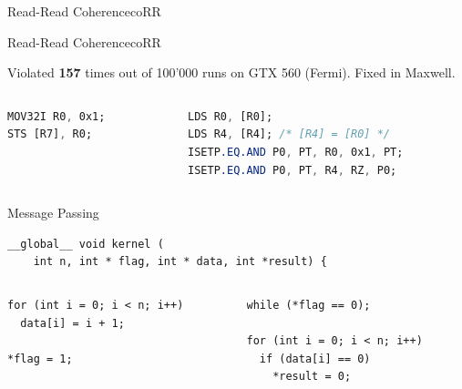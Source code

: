 \documentclass[aspectratio=169,compress]{beamer}
\newenvironment{sankeydiagram}[1][]{

  \def\sankeyflow##1##2{%
    \path[sankey fill]
    let
    \p1=(##1.north east),\p2=(##1.south east),
    \n1={atan2(\y1-\y2,\x1-\x2)-90},
    \p3=(##2.north west),\p4=(##2.south west),
    \n2={atan2(\y3-\y4,\x3-\x4)+90}
    in
    (\p1) to[out=\n1,in=\n2] (\p3) --
    (\p4) to[in=\n1,out=\n2] (\p2) -- cycle;
    \draw[sankey draw]
    let
    \p1=(##1.north east),\p2=(##1.south east),
    \n1={atan2(\y1-\y2,\x1-\x2)-90},
    \p3=(##2.north west),\p4=(##2.south west),
    \n2={atan2(\y3-\y4,\x3-\x4)+90}
    in
    (\p1) to[out=\n1,in=\n2] (\p3)
    (\p4) to[in=\n1,out=\n2] (\p2);
  }


  \tikzset{
    sankey tot length/.store in=\sankeytotallen,
    sankey tot quantity/.store in=\sankeytotalqty,
    sankey min radius/.store in=\sankeyminradius,
    sankey arrow length/.store in=\sankeyarrowlen,
    sankey debug/.is if=sankeydebug,
    sankey debug=false,
    sankey flow/.style={
      to path={
        \pgfextra{
          \pgfinterruptpath
          \edef\sankeystart{\tikztostart}
          \edef\sankeytarget{\tikztotarget}
          \sankeyflow{\sankeystart}{\sankeytarget}
          \endpgfinterruptpath
        }
      },
    },
    sankey node/.style={
      inner sep=0,minimum height={sankeyqtytolen(##1)},
      minimum width=0,draw=none,line width=0pt,
    },
    sankey angle/.store in=\sankeyangle,
    sankey fill/.style={line width=0pt,fill,white},
    sankey draw/.style={draw=black,line width=.4pt},
  }

  \newcommand\sankeynode[4]{%
    \node[sankey node=##1,rotate=##2] (##3) at (##4) {};
  }

  \newcommand\sankeynodestart[4]{%
    \sankeynode{##1}{##2}{##3}{##4}
    \begin{scope}[shift={(##3)},rotate=##2]
      \path[sankey fill]
      (##3.north west) -- ++(-\sankeyarrowlen,0)
      -- ([xshift=-\sankeyarrowlen/6]##3.west)
      -- ([xshift=-\sankeyarrowlen]##3.south west)
      -- (##3.south west) -- cycle;
      \path[sankey draw]
      (##3.north west) -- ++(-\sankeyarrowlen,0)
      -- ([xshift=-\sankeyarrowlen/6]##3.west)
      -- ([xshift=-\sankeyarrowlen]##3.south west)
      -- (##3.south west);
    \end{scope}
  }

  \newcommand\sankeynodeend[4]{%
    \sankeynode{##1}{##2}{##3}{##4}
    \begin{scope}[shift={(##3)},rotate=##2]
      \path[sankey fill]
      (##3.north east)
      -- ([xshift=\sankeyarrowlen]##3.east)
      -- (##3.south west) -- cycle;
      \path[sankey draw]
      (##3.north east)
      -- ([xshift=\sankeyarrowlen]##3.east)
      -- (##3.south west);
    \end{scope}
  }

  \newcommand\sankeyadvance[3][]{%
    \edef\name{##2}
    \ifstrempty{##1}{
      \def\newname{##2}
      \edef\name{##2-old}
      \path [late options={name=##2,alias=\name}];
    }{
      \def\newname{##1}
    }
    \path
    let
    \p1=(##2.north east),
    \p2=(##2.south east),
    \n1={atan2(\y1-\y2,\x1-\x2)-90},
    \p3=($(\p1)-(\p2)$),
    \n2={sankeylentoqty(veclen(\x3,\y3))},
    \p4=($(##2.east)!##3!-90:(##2.north east)$)
    in
    \pgfextra{
      \pgfmathsetmacro{\prop}{\n2}
      \pgfinterruptpath
      \sankeynode{\prop}{\n1}{\newname}{\p4}
      \path (\name) to[sankey flow] (\newname);
      \endpgfinterruptpath
    };
  }

  \newcommand\sankeyturn[3][]{%
    \edef\name{##2}
    \ifstrempty{##1}{
      \def\newname{##2}
      \edef\name{##2-old}
      \path [late options={name=##2,alias=\name}];
    }{
      \def\newname{##1}
    }
    \ifnumgreater{##3}{0}{
      \typeout{turn acw: ##3}
      \path
      let
      \p1=(##2.north east),
      \p2=(##2.south east),
      \p3=($(\p1)!-\sankeyminradius!(\p2)$),
      \n1={atan2(\y1-\y2,\x1-\x2)-90},
      \p4=($(\p1)-(\p2)$),
      \n2={sankeylentoqty(veclen(\x4,\y4))},
      \p5=(##2.east),
      \p6=($(\p3)!1!##3:(\p5)$)
      in
      \pgfextra{
        \pgfmathsetmacro{\prop}{\n2}
        \pgfinterruptpath
        \sankeynode{\prop}{\n1+##3}{\newname}{\p6}
        \path (\name) to[sankey flow] (\newname);
        \endpgfinterruptpath
      };
    }{
      \typeout{turn acw: ##3}
      \path
      let
      \p1=(##2.south east),
      \p2=(##2.north east),
      \p3=($(\p1)!-\sankeyminradius!(\p2)$),
      \n1={atan2(\y1-\y2,\x1-\x2)+90},
      \p4=($(\p1)-(\p2)$),
      \n2={sankeylentoqty(veclen(\x4,\y4))},
      \p5=(##2.east),
      \p6=($(\p3)!1!##3:(\p5)$)
      in
      \pgfextra{
        \pgfmathsetmacro{\prop}{\n2}
        \pgfinterruptpath
        \sankeynode{\prop}{\n1+##3}{\newname}{\p6}
        \path (\name) to[sankey flow] (\newname);
        \endpgfinterruptpath
      };
    }
  }

  \newcommand\sankeyfork[2]{%
    \def\name{##1}
    \def\listofforks{##2}
    \xdef\sankeytot{0}
    \path 
    let
    \p1=(\name.north east),
    \p2=(\name.south east),
    \n1={atan2(\y1-\y2,\x1-\x2)-90},
    \p4=($(\p1)-(\p2)$),
    \n2={sankeylentoqty(veclen(\x4,\y4))}
    in
    \pgfextra{
      \pgfmathsetmacro{\iprop}{\n2}
    }
    \foreach \prop/\name[count=\c] in \listofforks {
      let
      \p{start \name}=($(\p1)!\sankeytot/\iprop!(\p2)$),
      \n{nexttot}={\sankeytot+\prop},
      \p{end \name}=($(\p1)!\n{nexttot}/\iprop!(\p2)$),
      \p{mid \name}=($(\p{start \name})!.5!(\p{end \name})$)
      in
      \pgfextra{
        \xdef\sankeytot{\n{nexttot}}
        \pgfinterruptpath
        \sankeynode{\prop}{\n1}{\name}{\p{mid \name}}
        \endpgfinterruptpath
      }
    }
    \pgfextra{
      \pgfmathsetmacro{\diff}{abs(\iprop-\sankeytot)}
      \pgfmathtruncatemacro{\finish}{\diff<0.01?1:0}
      \ifnumequal{\finish}{1}{}{
        \message{*** Warning: bad sankey fork (maybe)...}
        \message{\iprop-\sankeytot}
      }
    };
  }

  \tikzset{
    declare function={
      sankeyqtytolen(\qty)=\qty/\sankeytotalqty*\sankeytotallen;
      sankeylentoqty(\len)=\len/\sankeytotallen*\sankeytotalqty;
    },
    sankey tot length=100pt,
    sankey tot quantity=100,
    sankey min radius=30pt,%
    sankey arrow length=10pt,%
    #1}
}{
}
\begin{document}
\begin{frame}[fragile]{Read-Read Coherence}{coRR}
\begin{figure}
	\end{figure}
\end{frame}

\begin{frame}[fragile]{Read-Read Coherence}{coRR}

Violated \textbf{157} times out of 100'000 runs on GTX 560 (Fermi). Fixed in Maxwell.

\begin{columns}
	\begin{column}{0.3\textwidth}
\begin{lstlisting}[language={SASS},title={Thread 1}]
MOV32I R0, 0x1;
STS [R7], R0;
\end{lstlisting}

	\end{column}
	\begin{column}{0.6\textwidth}
		\begin{lstlisting}[language={SASS},title={Thread 2}]
LDS R0, [R0];
LDS R4, [R4]; /* [R4] = [R0] */
ISETP.EQ.AND P0, PT, R0, 0x1, PT;
ISETP.EQ.AND P0, PT, R4, RZ, P0;
\end{lstlisting}
	\end{column}
	\end{columns}

\end{frame}

\begin{frame}[fragile]{Message Passing}{}
\centering
\begin{lstlisting}
__global__ void kernel (
    int n, int * flag, int * data, int *result) { 
\end{lstlisting}

\begin{columns}[T]
	\begin{column}{0.45\textwidth}
\begin{lstlisting}[title={Writer}]
for (int i = 0; i < n; i++)
  data[i] = i + 1;

*flag = 1;
\end{lstlisting}
\end{column}

\begin{column}{0.45\textwidth}
\begin{lstlisting}[title={Reader}]
while (*flag == 0);

for (int i = 0; i < n; i++)
  if (data[i] == 0)
    *result = 0;
\end{lstlisting}
			\end{column}
	\end{columns}
\end{frame}
\end{document}
